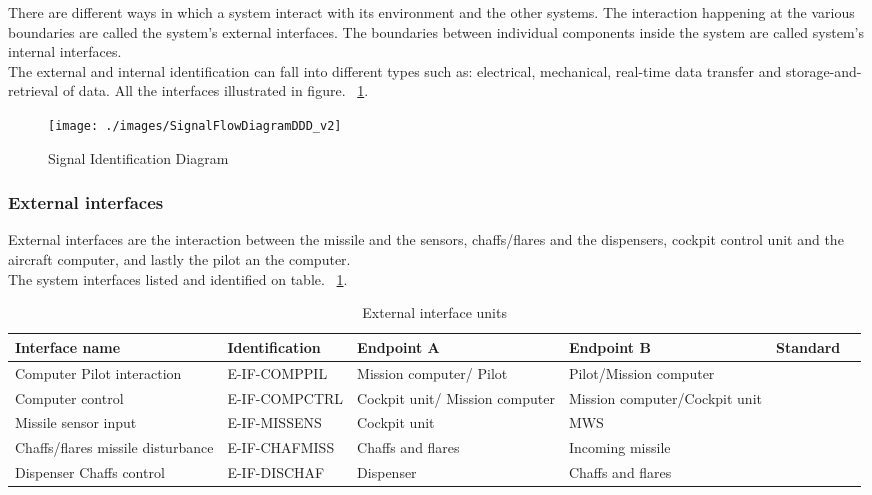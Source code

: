 There are different ways in which a system interact with its environment and the other systems. The interaction happening at the various boundaries are called the system's external interfaces. The boundaries between individual components inside the system are called system's internal interfaces.\\
The external and internal identification can fall into different types such as: electrical, mechanical, real-time data transfer and storage-and-retrieval of data. All the interfaces illustrated in figure. ~\ref{fig:sigFlowDiagram}.

  \begin{figure}[h]
  	\centering
 	\texttt{[image: ./images/SignalFlowDiagramDDD\_v2]}\\
  	\caption{Signal Identification Diagram}
      \label{fig:sigFlowDiagram}
  \end{figure}

\subsubsection{External interfaces}
 External interfaces are the interaction between the missile and the sensors, chaffs/flares and the dispensers, cockpit control unit and the aircraft computer, and lastly the pilot an the computer.\\
 The system interfaces listed and identified on table. ~\ref{tab:External}.


\begin{center}
\begin{table}[h]
\caption{External interface units}
\label{tab:External}
\begin{tabular}{ | p{2cm} | l | p{2.3cm} | p{2.3cm} | l | p{1cm} |}
\hline
\textbf{Interface name} & \textbf{Identification} & \textbf{Endpoint A} & \textbf{Endpoint B} & \textbf{Standard}\\ \hline
Computer Pilot interaction & E-IF-COMPPIL & Mission computer/ Pilot & Pilot/Mission computer & \\ \hline
Computer control & E-IF-COMPCTRL & Cockpit unit/ Mission computer &Mission computer/Cockpit unit & \\ \hline
Missile sensor input & E-IF-MISSENS & Cockpit unit & MWS & \\ \hline
Chaffs/flares missile disturbance& E-IF-CHAFMISS & Chaffs and flares & Incoming missile & \\ \hline
Dispenser Chaffs control & E-IF-DISCHAF & Dispenser & Chaffs and flares & \\ \hline
\end{tabular}
\end{table}
\end{center}

